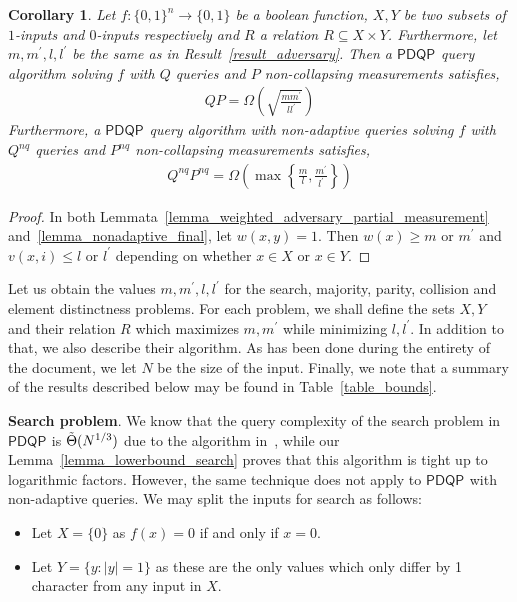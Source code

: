 \documentclass[10pt,a4paper]{article}
\newcommand{\queryamount}[0]{\ensuremath{Q}\xspace}
\newcommand{\abilityamount}[0]{\ensuremath{P}\xspace} %
\newcommand{\nonadaptivelabel}[0]{\ensuremath{nq}\xspace}
\newcommand{\kinputs}[1]{\ensuremath{#1}-inputs}
\newcommand{\compclass}[2][]{\ensuremath{\mathsf{#2}^{#1}}\xspace}
\newcommand{\pdqpname}[0]{\compclass{PDQP}}
\newtheorem{corollary}[theorem]{Corollary}
\begin{document}
\begin{corollary}\label{corollary_basic_adversary}
    Let $f:\{0,1\}^n\rightarrow \{0,1\}$ be a boolean function, $X,Y$ be two subsets of \kinputs{1} and \kinputs{0} respectively and $R$ a relation $R\subseteq X \times Y$. Furthermore, let $m,m^\prime, l, l^\prime$ be the same as in Result~\ref{result_adversary}. Then a \pdqpname query algorithm solving $f$ with \queryamount queries and \abilityamount non-collapsing measurements satisfies,
    \begin{align*}
        \queryamount\abilityamount = \Omega\left( \sqrt{\frac{mm^\prime}{ll^\prime}} \right)
    \end{align*}
    Furthermore, a \pdqpname query algorithm with \emph{non-adaptive} queries solving $f$ with $\queryamount^{\nonadaptivelabel}$ queries and $\abilityamount^{\nonadaptivelabel}$ non-collapsing measurements satisfies,
    \begin{align*}
        \queryamount^{\nonadaptivelabel} \abilityamount^{\nonadaptivelabel} = \Omega \left( \max\left\{\frac{m}{l}, \frac{m^\prime}{l^\prime}\right\}\right)
    \end{align*}
\end{corollary}
\begin{proof}
    In both Lemmata~\ref{lemma_weighted_adversary_partial_measurement} and~\ref{lemma_nonadaptive_final}, let $w(x,y) = 1$. Then $w(x)\geq m$ or $m^\prime$ and $v(x,i)\leq l$ or $l^\prime$ depending on whether $x\in X$ or $x\in Y$.
\end{proof}

Let us obtain the values $m,m^\prime, l, l^\prime$ for the search, majority, parity, collision and element distinctness problems. For each problem, we shall define the sets $X, Y$ and their relation $R$ which maximizes $m, m^\prime$ while minimizing $l, l^\prime$. In addition to that, we also describe their algorithm. As has been done during the entirety of the document, we let $N$ be the size of the input. Finally, we note that a summary of the results described below may be found in Table~\ref{table_bounds}.

\textbf{Search problem}. We know that the query complexity of the search problem in \pdqpname is $\Tilde{\Theta}(N^{1/3})$ due to the algorithm in~\cite{space_above_bqp}, while our Lemma~\ref{lemma_lowerbound_search} proves that this algorithm is tight up to logarithmic factors. However, the same technique does not apply to \pdqpname with non-adaptive queries. We may split the inputs for search as follows:
\begin{itemize}
    \item Let $X=\{0\}$ as $f(x)=0$ if and only if $x=0$.
    \item Let $Y=\{y: |y|=1\}$ as these are the only values which only differ by 1 character from any input in $X$.
\end{itemize}
\end{document}

